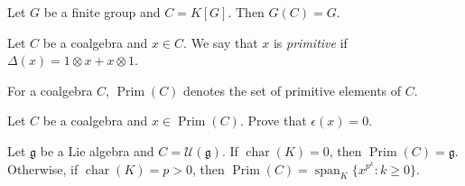 \begin{example}
    Let $G$ be a finite group and $C=K[G]$. Then 
    $G(C)=G$.  
\end{example}

\begin{definition}
  Let $C$ be a coalgebra and $x\in C$. We say that 
  $x$ is \emph{primitive} if $\Delta(x)=1\otimes x+x\otimes 1$. 
\end{definition}

For a coalgebra $C$, $\operatorname{Prim}(C)$ denotes 
the set of primitive elements of $C$. 

\begin{exercise}
\label{xca:primitive}
  Let $C$ be a coalgebra and $x\in\operatorname{Prim}(C)$. 
  Prove that $\epsilon(x)=0$. 
\end{exercise}

\begin{example}
    Let $\mathfrak{g}$ be a Lie algebra 
    and $C=\mathcal{U}(\mathfrak{g})$. If $\operatorname{char}(K)=0$, then $\operatorname{Prim}(C)=\mathfrak{g}$. Otherwise, if 
    $\operatorname{char}(K)=p>0$, then 
    $\operatorname{Prim}(C)=\operatorname{span}_K\{x^{p^k}:k\geq0\}$.
\end{example}


